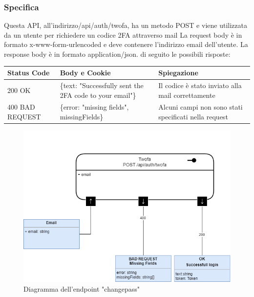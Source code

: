 \documentclass{report}
\begin{document}
\subsubsection*{Specifica}
Questa API, all'indirizzo/api/auth/twofa, ha un metodo POST e viene utilizzata da un utente per richiedere un codice 2FA attraverso mail
La request body è in formato x-www-form-urlencoded e deve contenere l'indirizzo email dell'utente.
La response body è in formato application/json. di seguito le possibili risposte:
\begin{center} %
	\centering
	\begin{tabular}{ |p{4cm}|p{5cm}|p{4cm}| }
		\hline
		\centering Status Code & \qquad\quad Body e Cookie & \qquad\qquad Spiegazione\\ %
		\hline
		200 OK & \{text: "Successfully sent the 2FA code to your email"\} &  Il codice è stato inviato alla mail correttamente\\
		\hline
		400 BAD REQUEST & \{error: "missing fields", missingFields\} & Alcuni campi non sono stati specificati nella request\\ %
		\hline
	\end{tabular}
\end{center}
\begin{figure}[H]
	\centering\includegraphics[width=1\textwidth]{images/microservizio-autenticazione/diagrams/diagramma_twofa.drawio.png}
	\caption{Diagramma dell'endpoint "changepass"}
\end{figure}
\end{document}
